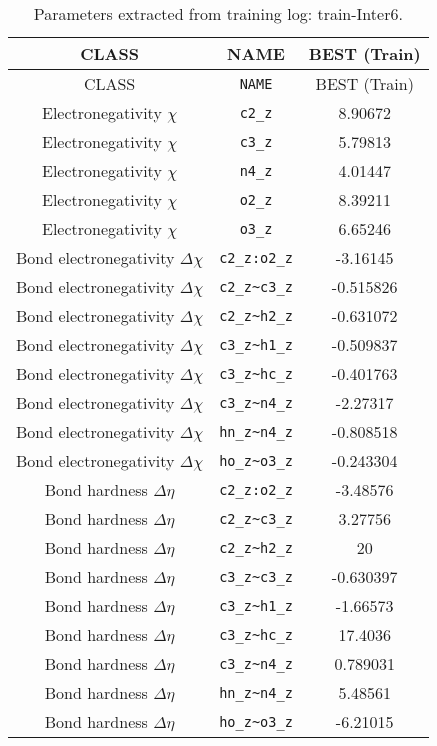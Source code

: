 \begin{table}[ht]
\caption{Parameters extracted from training log: train-Inter6.}
\begin{tabular}{|c|c|c|}
\hline
CLASS & NAME & BEST (Train) \\ 
\hline
CLASS & \verb^NAME^ & BEST (Train) \\ 
Electronegativity $\chi$ & \verb^c2_z^ & 8.90672 \\ 
Electronegativity $\chi$ & \verb^c3_z^ & 5.79813 \\ 
Electronegativity $\chi$ & \verb^n4_z^ & 4.01447 \\ 
Electronegativity $\chi$ & \verb^o2_z^ & 8.39211 \\ 
Electronegativity $\chi$ & \verb^o3_z^ & 6.65246 \\ 
Bond electronegativity $\Delta\chi$ & \verb^c2_z:o2_z^ & -3.16145 \\ 
Bond electronegativity $\Delta\chi$ & \verb^c2_z~c3_z^ & -0.515826 \\ 
Bond electronegativity $\Delta\chi$ & \verb^c2_z~h2_z^ & -0.631072 \\ 
Bond electronegativity $\Delta\chi$ & \verb^c3_z~h1_z^ & -0.509837 \\ 
Bond electronegativity $\Delta\chi$ & \verb^c3_z~hc_z^ & -0.401763 \\ 
Bond electronegativity $\Delta\chi$ & \verb^c3_z~n4_z^ & -2.27317 \\ 
Bond electronegativity $\Delta\chi$ & \verb^hn_z~n4_z^ & -0.808518 \\ 
Bond electronegativity $\Delta\chi$ & \verb^ho_z~o3_z^ & -0.243304 \\ 
Bond hardness $\Delta\eta$ & \verb^c2_z:o2_z^ & -3.48576 \\ 
Bond hardness $\Delta\eta$ & \verb^c2_z~c3_z^ & 3.27756 \\ 
Bond hardness $\Delta\eta$ & \verb^c2_z~h2_z^ & 20 \\ 
Bond hardness $\Delta\eta$ & \verb^c3_z~c3_z^ & -0.630397 \\ 
Bond hardness $\Delta\eta$ & \verb^c3_z~h1_z^ & -1.66573 \\ 
Bond hardness $\Delta\eta$ & \verb^c3_z~hc_z^ & 17.4036 \\ 
Bond hardness $\Delta\eta$ & \verb^c3_z~n4_z^ & 0.789031 \\ 
Bond hardness $\Delta\eta$ & \verb^hn_z~n4_z^ & 5.48561 \\ 
Bond hardness $\Delta\eta$ & \verb^ho_z~o3_z^ & -6.21015 \\ 

\end{tabular}
\end{table}

